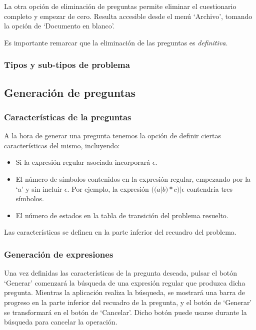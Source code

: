 
La otra opción de eliminación de preguntas permite eliminar el cuestionario completo y empezar de cero.
Resulta accesible desde el menú `Archivo', tomando la opción de `Documento en blanco'.


Es importante remarcar que la eliminación de las preguntas es \emph{definitiva}.

\subsubsection{Tipos y sub-tipos de problema}

\subsection{Generación de preguntas}

\subsubsection{Características de la preguntas}
A la hora de generar una pregunta tenemos la opción de definir ciertas características del mismo, incluyendo:
\begin{itemize}
	\item Si la expresión regular asociada incorporará $ \epsilon $.
	\item El número de símbolos contenidos en la expresión regular, empezando por la `a' y sin incluir $ \epsilon $.
	Por ejemplo, la expresión $ ((a|b)*c)|\epsilon $ contendría tres símbolos.
	\item El número de estados en la tabla de transición del problema resuelto.
\end{itemize}
Las características se definen en la parte inferior del recuadro del problema.


\subsubsection{Generación de expresiones}
Una vez definidas las características de la pregunta deseada, pulsar el botón `Generar' comenzará la búsqueda de una expresión regular que produzca dicha pregunta.
Mientras la aplicación realiza la búsqueda, se mostrará una barra de progreso en la parte inferior del recuadro de la pregunta, y el botón de `Generar' se transformará en el botón de `Cancelar'.
Dicho botón puede usarse durante la búsqueda para cancelar la operación.


